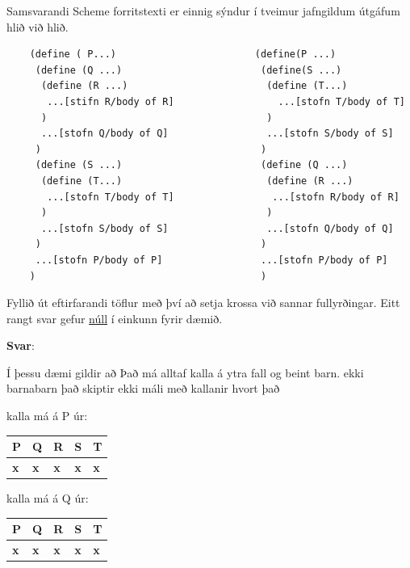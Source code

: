 \documentclass{article}
\newcommand{\bo}[1]{\textbf{#1}}
\begin{document}
     Samsvarandi Scheme forritstexti er einnig sýndur í tveimur jafngildum útgáfum 
     hlið við hlið. 

     \begin{verbatim}
    (define ( P...)                        (define(P ...)
     (define (Q ...)                        (define(S ...)
      (define (R ...)                        (define (T...)
       ...[stifn R/body of R]                  ...[stofn T/body of T]
      )                                      )
      ...[stofn Q/body of Q]                 ...[stofn S/body of S]
     )                                      )
     (define (S ...)                        (define (Q ...)
      (define (T...)                         (define (R ...)
       ...[stofn T/body of T]                 ...[stofn R/body of R]
      )                                      )
      ...[stofn S/body of S]                 ...[stofn Q/body of Q]
     )                                      )
     ...[stofn P/body of P]                 ...[stofn P/body of P]
    )                                       )
     \end{verbatim}
    
     Fyllið út eftirfarandi töflur með því að setja krossa við sannar fullyrðingar.
     Eitt rangt svar gefur \underline{núll} í einkunn fyrir dæmið.

     \textbf{Svar}:

     Í þessu dæmi gildir að Það má alltaf kalla á ytra fall og beint barn. ekki barnabarn
     það skiptir ekki máli með kallanir hvort það

     kalla má á P úr:


     \begin{tabularx}{\textwidth}{ |X|X|X|X|X|}
        \hline
        \textbf{P}  & \textbf{Q}  & \textbf{R}  & \textbf{S}  & \textbf{T} \\ \hline
        \bo{x} & \bo{x} & \bo{x} & \bo{x} & \bo{x} \\ \hline
     \end{tabularx}


     kalla má á Q úr:

     
     \begin{tabularx}{\textwidth}{ |X|X|X|X|X|}
        \hline
        \textbf{P}  & \textbf{Q}  & \textbf{R}  & \textbf{S}  & \textbf{T} \\ \hline
        \bo{x} & \bo{x} & \bo{x} & \bo{x} & \bo{x} \\ \hline
     \end{tabularx}
\end{document}
